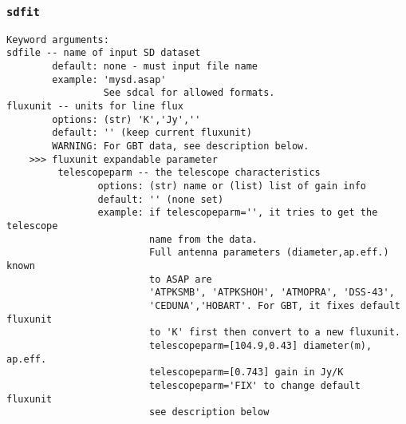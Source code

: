 \subsubsection{{\tt sdfit}}
\label{section:sd.sdtasks.tasks.sdfit}

\begin{verbatim}
Keyword arguments:
sdfile -- name of input SD dataset
        default: none - must input file name
        example: 'mysd.asap'
                 See sdcal for allowed formats.
fluxunit -- units for line flux
        options: (str) 'K','Jy',''
        default: '' (keep current fluxunit)
        WARNING: For GBT data, see description below.
    >>> fluxunit expandable parameter
         telescopeparm -- the telescope characteristics
                options: (str) name or (list) list of gain info
                default: '' (none set)
                example: if telescopeparm='', it tries to get the telescope
                         name from the data.
                         Full antenna parameters (diameter,ap.eff.) known
                         to ASAP are
                         'ATPKSMB', 'ATPKSHOH', 'ATMOPRA', 'DSS-43',
                         'CEDUNA','HOBART'. For GBT, it fixes default fluxunit
                         to 'K' first then convert to a new fluxunit.
                         telescopeparm=[104.9,0.43] diameter(m), ap.eff.
                         telescopeparm=[0.743] gain in Jy/K
                         telescopeparm='FIX' to change default fluxunit
                         see description below
        

\end{verbatim}
